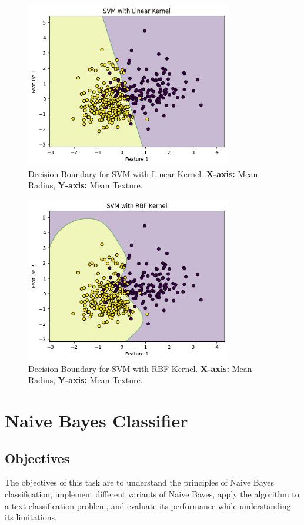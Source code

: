 \documentclass[a4paper,12pt]{article}
\begin{document}
\begin{figure}[H]
    \centering
    \includegraphics[width=0.8\textwidth]{Q1_1.png}
    \caption{Decision Boundary for SVM with Linear Kernel. \textbf{X-axis:} Mean Radius, \textbf{Y-axis:} Mean Texture.}
    \label{fig:svm_linear}
\end{figure}
\begin{figure}[H]
    \centering
    \includegraphics[width=0.8\textwidth]{Q1_2.png}
    \caption{Decision Boundary for SVM with RBF Kernel. \textbf{X-axis:} Mean Radius, \textbf{Y-axis:} Mean Texture.}
    \label{fig:svm_rbf}
\end{figure}


\newpage

\section{Naive Bayes Classifier}

\subsection{Objectives}
The objectives of this task are to understand the principles of Naive Bayes classification, implement different variants of Naive Bayes, apply the algorithm to a text classification problem, and evaluate its performance while understanding its limitations.
\end{document}
